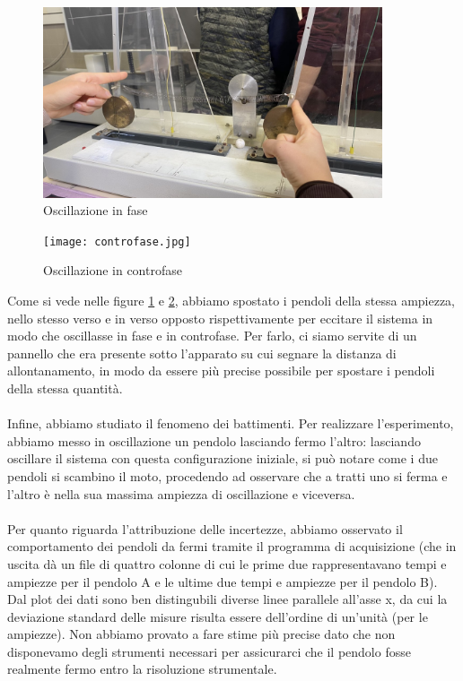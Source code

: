 \documentclass{article}
\begin{document}
\begin{figure} [H]
    \centering
    \includegraphics[width=10cm]{fase.jpg}
    \caption{Oscillazione in fase}
    \label{fig:fase}
\end{figure}
\begin{figure} [H]
    \centering
    \texttt{[image: controfase.jpg]}
    \caption{Oscillazione in controfase}
    \label{fig:controfase}
\end{figure}
 Come si vede nelle figure \ref{fig:fase} e \ref{fig:controfase}, abbiamo spostato i pendoli della stessa ampiezza, nello stesso verso e in verso opposto rispettivamente per eccitare il sistema in modo che oscillasse in fase e in controfase. Per farlo, ci siamo servite di un pannello che era presente sotto l'apparato su cui segnare la distanza di allontanamento, in modo da essere più precise possibile per spostare i pendoli della stessa quantità.\\
 \\
Infine, abbiamo studiato il fenomeno dei battimenti. Per realizzare l'esperimento, abbiamo messo in oscillazione un pendolo lasciando fermo l'altro: lasciando oscillare il sistema con questa configurazione iniziale, si può notare come i due pendoli si scambino il moto, procedendo ad osservare che a tratti uno si ferma e l'altro è nella sua massima ampiezza di oscillazione e viceversa. \\
\\
Per quanto riguarda l'attribuzione delle incertezze, abbiamo
osservato il comportamento dei pendoli da fermi tramite il programma di acquisizione (che in uscita dà un file di quattro colonne di cui le prime due rappresentavano tempi e ampiezze per il pendolo A e le ultime due tempi e ampiezze per il pendolo B). Dal plot dei dati
sono ben distingubili diverse linee parallele all’asse x, da cui la deviazione standard delle
misure risulta essere dell’ordine di un'unità (per le ampiezze). Non abbiamo provato a fare stime più precise dato
che non disponevamo degli strumenti necessari per assicurarci che il pendolo fosse realmente fermo
entro la risoluzione strumentale.
\end{document}
